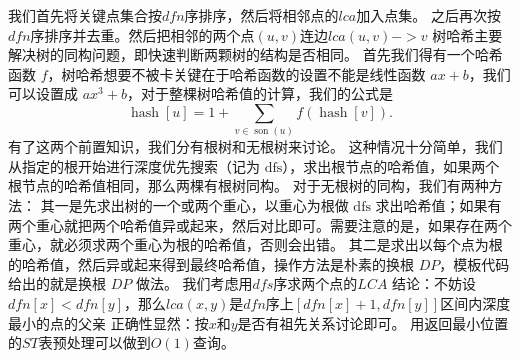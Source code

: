 {}我们首先将关键点集合按$ dfn $序排序，然后将相邻点的$ lca $加入点集。\markdownRendererParagraphSeparator
{}之后再次按$ dfn $序排序并去重。然后把相邻的两个点$ (u,v) $连边$ lca(u,v)->v $\markdownRendererInterblockSeparator
{}\markdownRendererInterblockSeparator
{}
\markdownRendererSectionEnd \markdownRendererSectionBegin
{}\markdownRendererInterblockSeparator
{}树哈希主要解决树的同构问题，即快速判断两颗树的结构是否相同。\markdownRendererParagraphSeparator
{}首先我们得有一个哈希函数 $f$，树哈希想要不被卡关键在于哈希函数的设置不能是线性函数 $ax+b$，我们可以设置成 $ax^3+b$，对于整棵树哈希值的计算，我们的公式是\markdownRendererSoftLineBreak
{}$$\operatorname{hash}[u]=1+\sum_{v\in \operatorname{son}(u)} f(\operatorname{hash}[v]).$$\markdownRendererParagraphSeparator
{}有了这两个前置知识，我们分有根树和无根树来讨论。\markdownRendererParagraphSeparator
{} 这种情况十分简单，我们从指定的根开始进行深度优先搜索（记为 $\mathrm{dfs}$），求出根节点的哈希值，如果两个根节点的哈希值相同，那么两棵有根树同构。\markdownRendererParagraphSeparator
{} 对于无根树的同构，我们有两种方法：\markdownRendererParagraphSeparator
{}其一是先求出树的一个或两个重心，以重心为根做 $\mathrm{dfs}$ 求出哈希值；如果有两个重心就把两个哈希值异或起来，然后对比即可。需要注意的是，如果存在两个重心，就必须求两个重心为根的哈希值，否则会出错。\markdownRendererHardLineBreak
{}其二是求出以每个点为根的哈希值，然后异或起来得到最终哈希值，操作方法是朴素的换根 $DP$，模板代码给出的就是换根 $DP$ 做法。\markdownRendererInterblockSeparator
{}\markdownRendererInterblockSeparator
{}
\markdownRendererSectionEnd \markdownRendererSectionBegin
{}\markdownRendererInterblockSeparator
{}我们考虑用$ dfs $序求两个点的$ LCA $\markdownRendererParagraphSeparator
{}结论：不妨设$ dfn[x]<dfn[y] $，那么$ lca(x,y) $是$ dfn $序上$ [dfn[x]+1,dfn[y]] $区间内深度最小的点的父亲\markdownRendererParagraphSeparator
{}正确性显然：按$ x和y $是否有祖先关系讨论即可。\markdownRendererParagraphSeparator
{}用返回最小位置的$ ST $表预处理可以做到$ O(1) $查询。\markdownRendererInterblockSeparator
{}\markdownRendererInterblockSeparator
{}
\markdownRendererSectionEnd \markdownRendererSectionBegin
